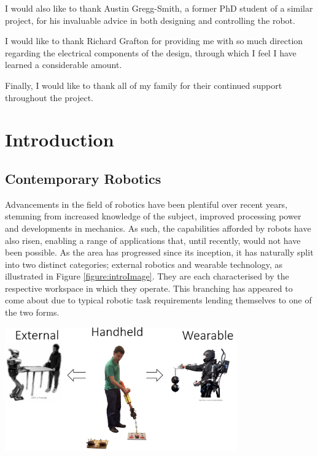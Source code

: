\documentclass[11pt]{article}
\begin{document}
I would also like to thank Austin Gregg-Smith, a former PhD student of a similar project, for his invaluable advice in both designing and controlling the robot. 

I would like to thank Richard Grafton for providing me with so much direction regarding the electrical components of the design, through which I feel I have learned a considerable amount.

Finally, I would like to thank all of my family for their continued support throughout the project. 
\pagebreak


\tableofcontents
\pagebreak

\renewcommand{\thepage}{\arabic{page}}%

\setcounter{page}{1}%


\pagestyle{mypage}
\section{Introduction}
\subsection{Contemporary Robotics}
Advancements in the field of robotics have been plentiful over recent years, stemming from increased knowledge of the subject, improved processing power and developments in mechanics. As such, the capabilities afforded by robots have also risen, enabling a range of applications that, until recently, would not have been possible. As the area has progressed since its inception, it has naturally split into two distinct categories; external robotics and wearable technology, as illustrated in Figure \ref{figure:introImage}. They are each characterised by the respective workspace in which they operate. This branching has appeared to come about due to typical robotic task requirements lending themselves to one of the two forms.


\begin{center}
\includegraphics[width=0.75\textwidth]{images/introImage.png}
\label{figure:introImage}
\end{center}
\end{document}
